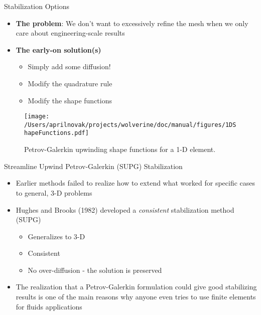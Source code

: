 \documentclass{beamer}
\begin{document}
\begin{frame}{Stabilization Options}

\begin{itemize}
\item \textbf{The problem}: We don't want to excessively refine the mesh when we only care about engineering-scale results
\item \textbf{The early-on solution(s)}
	\begin{itemize}
		\item Simply add some diffusion!
		\item Modify the quadrature rule
		\item Modify the shape functions
	\end{itemize}
\end{itemize}

\begin{figure}[H]
  \centering
  \texttt{[image: /Users/aprilnovak/projects/wolverine/doc/manual/figures/1DShapeFunctions.pdf]}
  \caption{Petrov-Galerkin upwinding shape functions for a 1-D element.}
\end{figure}

\end{frame}


\begin{frame}{Streamline Upwind Petrov-Galerkin (SUPG) Stabilization}

\begin{itemize}
\item Earlier methods failed to realize how to extend what worked for specific cases to general, 3-D problems
\item Hughes and Brooks (1982) developed a \textit{consistent} stabilization method (SUPG)
	\begin{itemize}
		\item Generalizes to 3-D
		\item Consistent
		\item No over-diffusion - the solution is preserved
	\end{itemize}
\item The realization that a Petrov-Galerkin formulation could give good stabilizing results is one of the main reasons why anyone even tries to use finite elements for fluids applications
\end{itemize}

\end{frame}
\end{document}

